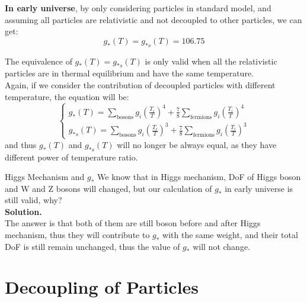 \clearpage
\begin{theory}
    \textbf{In early universe}, by only considering particles in standard model, and assuming all particles are relativistic and not decoupled to other particles, we can get:
    \[
        g_*(T) = g_{*s}(T) = 106.75
    \]
\end{theory}

\begin{importantnote}
    The equivalence of $g_*(T) = g_{*s}(T)$ is only valid when all the relativistic particles are in thermal equilibrium and have the same temperature. \\

    Again, if we consider the contribution of decoupled particles with different temperature, the equation will be:
    \[
        \begin{cases}
            g_*(T) = \sum_{\text{bosons}} g_i \left( \frac{T_i}{T} \right)^4 + \frac{7}{8} \sum_{\text{fermions}} g_i \left( \frac{T_i}{T} \right)^4 \\
            g_{*s}(T) = \sum_{\text{bosons}} g_i \left( \frac{T_i}{T} \right)^3 + \frac{7}{8} \sum_{\text{fermions}} g_i \left( \frac{T_i}{T} \right)^3
        \end{cases}
    \]
    and thus $g_*(T)$ and $g_{*s}(T)$ will no longer be always equal, as they have different power of temperature ratio.
\end{importantnote}

\bigskip\noindent
\begin{example}{Higgs Mechanism and $g_*$ }{}
    We know that in Higgs mechanism, DoF of Higgs boson and W and Z bosons will changed, but our calculation of $g_*$ in early universe is still valid, why? \\

    \bigskip\textbf{Solution.}\quad \\
    The answer is that both of them are still boson before and after Higgs mechanism, thus they will contribute to $g_*$ with the same weight, and their total DoF is still remain unchanged, thus the value of $g_*$ will not change. \\
\end{example}


\clearpage
\section{Decoupling of Particles}
